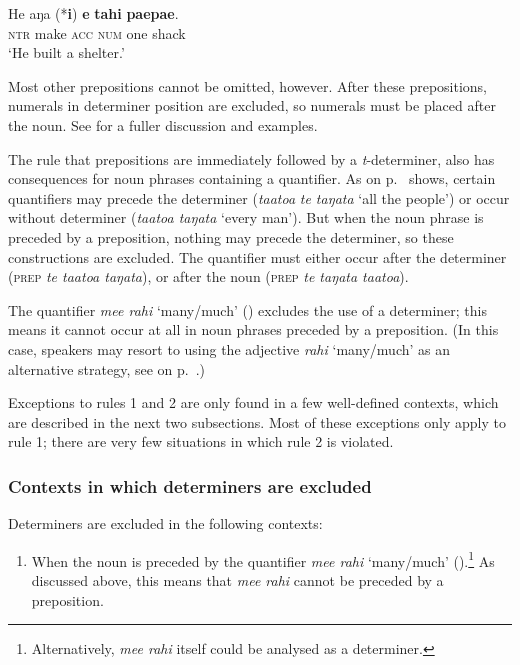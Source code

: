 \ea\label{ex:5.16}
\gll He aŋa (*\textbf{i}) \textbf{e} \textbf{tahi} \textbf{paepae}. \\
\textsc{ntr} make \textsc{acc} \textsc{num} one shack \\

\glt
‘He built a shelter.’ \textstyleExampleref{[Blx-2-1.015]}
\z

Most other prepositions cannot be omitted, however. After these prepositions, numerals in determiner position are excluded, so numerals must be placed after the noun. See  for a fuller discussion and examples.

The rule that prepositions are immediately followed by a \textit{t}{}-determiner, also has consequences for noun phrases containing a quantifier. As  on p.~\pageref{tab:30} shows, certain quantifiers may precede the determiner (\textit{ta{\ꞌ}ato{\ꞌ}a} \textit{te taŋata} ‘all the people’) or occur without determiner (\textit{ta{\ꞌ}ato{\ꞌ}a taŋata} ‘every man’). But when the noun phrase is preceded by a preposition, nothing may precede the determiner, so these constructions are excluded. The quantifier must either occur after the determiner (\textsc{prep} \textit{te ta}\textit{{\ꞌ}ato{\ꞌ}a taŋata}), or after the noun (\textsc{prep} \textit{te taŋata ta{\ꞌ}ato{\ꞌ}a}). 

The quantifier \textit{me{\ꞌ}e rahi} ‘many/much’ () excludes the use of a determiner; this means it cannot occur at all in noun phrases preceded by a preposition. (In this case, speakers may resort to using the adjective \textit{rahi} ‘many/much’ as an alternative strategy, see  on p.~\pageref{ex:4.102}.)

Exceptions to rules 1 and 2 are only found in a few well-defined contexts, which are described in the next two subsections. Most of these exceptions only apply to rule 1; there are very few situations in which rule 2 is violated.

\subsubsection{Contexts in which determiners are excluded}\label{sec:5.3.2.2}

Determiners are excluded in the following contexts:

\begin{enumerate}
\setcounter{enumi}{0}
\item
When the noun is preceded by the quantifier \textit{me{\ꞌ}e rahi} ‘many/much’ ().\footnote{\label{fn:247}Alternatively, \textit{me}\textit{{\ꞌ}e rahi} itself could be analysed as a determiner.}  As discussed above, this means that \textit{me{\ꞌ}e rahi} cannot be preceded by a preposition.
\end{enumerate}

